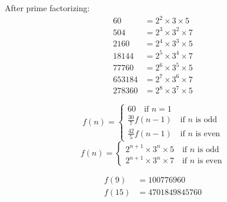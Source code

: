 \documentclass{article}
\begin{document}
\begin{solution}
After prime factorizing:
\begin{align*}
60 & =2^2 \times 3 \times 5 \\
504 & =2^3 \times 3^2 \times 7 \\
2160 & =2^4 \times 3^3 \times 5 \\
18144 & =2^5 \times 3^4 \times 7 \\
77760 & =2^6 \times 3^5 \times 5 \\
653184 & =2^7 \times 3^6 \times 7 \\
278360 & =2^8 \times 3^7 \times 5
\end{align*}


\[
f(n)=
\begin{cases}
    60\quad \text{if }n=1\\
    \frac{30}{7}f(n-1)\quad \text{if }n\text{ is odd}\\
    \frac{42}{5}f(n-1)\quad \text{if }n\text{ is even}
\end{cases}
\]
\[
f(n)=
\begin{cases}
    2^{n+1}\times 3^n\times 5\quad \text{if }n\text{ is odd}\\
    2^{n+1}\times 3^n\times 7\quad \text{if }n\text{ is even}
\end{cases}
\]
\end{solution}
\begin{solution}
\begin{align*}
    f(9)&=100776960\\
    f(15)&=4701849845760
\end{align*}
\end{solution}
\end{document}
